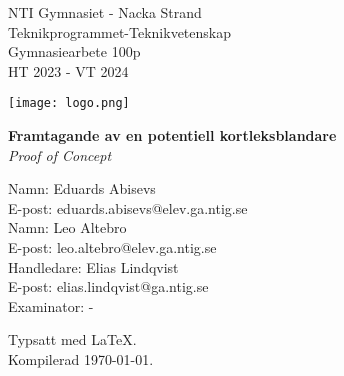 \begin{titlepage}
	\begin{minipage}[t]{0.45\textwidth}
		\raggedright
		NTI Gymnasiet - Nacka Strand \\
		Teknikprogrammet-Teknikvetenskap \\
		Gymnasiearbete 100p \\
		HT 2023 - VT 2024
	\end{minipage}
	\begin{minipage}[t]{0.5\textwidth}
		\raggedleft
		\begin{adjustbox}{valign=t}
			\texttt{[image: logo.png]}
		\end{adjustbox}
	\end{minipage}

	\vspace*{\fill} %

	\begin{center}
		\Large\textbf{Framtagande av en potentiell kortleksblandare}\\
		\large\textit{Proof of Concept}
	\end{center}

	\vspace*{\fill} %

	\begin{minipage}[b]{0.45\textwidth}
		\raggedright
		Namn: Eduards Abisevs\\
		E-post: eduards.abisevs@elev.ga.ntig.se\\
		Namn: Leo Altebro\\
		E-post: leo.altebro@elev.ga.ntig.se\\
		Handledare: Elias Lindqvist\\ 
		E-post: elias.lindqvist@ga.ntig.se \\
		Examinator: -
	\end{minipage}
	\begin{minipage}[b]{0.5\textwidth}
		\raggedleft
		Typsatt med \LaTeX. \\
		Kompilerad \today.
	\end{minipage}
\end{titlepage}
